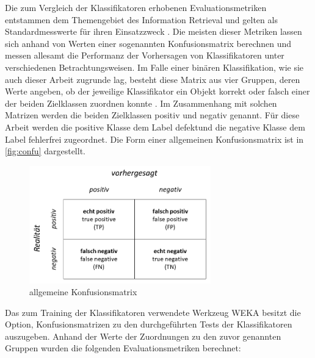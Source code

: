Die zum Vergleich der Klassifikatoren erhobenen Evaluationsmetriken entstammen dem Themengebiet des Information Retrieval und gelten als Standardmesswerte für ihren Einsatzzweck \cite{Sammut2017}. Die meisten dieser Metriken lassen sich anhand von Werten einer sogenannten Konfusionsmatrix berechnen und messen allesamt die Performanz der Vorhersagen von Klassifikatoren unter verschiedenen Betrachtungsweisen. Im Falle einer binären Klassifikation,  wie sie auch dieser Arbeit zugrunde lag, besteht diese Matrix aus vier Gruppen, deren Werte angeben, ob der jeweilige Klassifikator ein Objekt korrekt oder falsch einer der beiden Zielklassen zuordnen konnte \cite{Sammut2017}. Im Zusammenhang mit solchen Matrizen werden die beiden Zielklassen \glqq positiv\grqq{} und \glqq negativ\grqq{} genannt. Für diese Arbeit werden die positive Klasse dem Label \glqq defekt\grqq und die negative Klasse dem Label \glqq fehlerfrei\grqq{} zugeordnet. Die Form einer allgemeinen Konfusionsmatrix ist in \autoref{fig:confu} dargestellt.

\begin{figure}[H]
    \centering
    \includegraphics[width=0.7\textwidth]{images/Confusion}
    \caption{allgemeine Konfusionsmatrix\label{fig:confu}}
\end{figure}

Das zum Training der Klassifikatoren verwendete Werkzeug WEKA besitzt die Option, Konfusionsmatrizen zu den durchgeführten Tests der Klassifikatoren auszugeben. Anhand der Werte der Zuordnungen zu den zuvor genannten Gruppen wurden die folgenden Evaluationsmetriken berechnet: 

